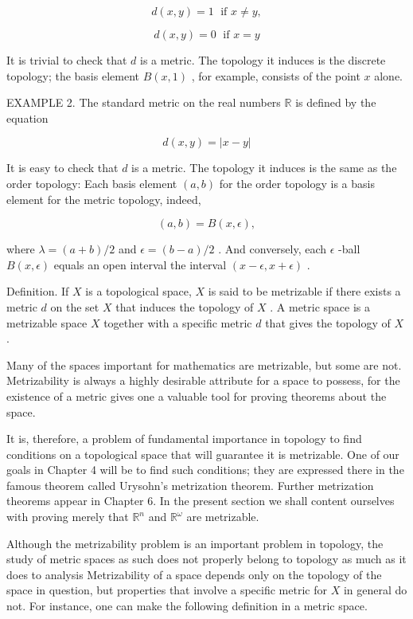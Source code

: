 \documentclass[10pt]{article}
\begin{document}
\[
d\left( {x,y}\right)  = 1\;\text{ if }x \neq  y,
\]

\[
d\left( {x,y}\right)  = 0\;\text{ if }x = y
\]

It is trivial to check that \(d\) is a metric. The topology it induces is the discrete topology; the basis element \(B\left( {x,1}\right)\) , for example, consists of the point \(x\) alone.

EXAMPLE 2. The standard metric on the real numbers \(\mathbb{R}\) is defined by the equation

\[
d\left( {x,y}\right)  = \left| {x - y}\right|
\]

It is easy to check that \(d\) is a metric. The topology it induces is the same as the order topology: Each basis element \(\left( {a,b}\right)\) for the order topology is a basis element for the metric topology, indeed,

\[
\left( {a,b}\right)  = B\left( {x,\epsilon }\right) ,
\]

where \(\lambda  = \left( {a + b}\right) /2\) and \(\epsilon  = \left( {b - a}\right) /2\) . And conversely, each \(\epsilon\) -ball \(B\left( {x,\epsilon }\right)\) equals an open interval the interval \(\left( {x - \epsilon ,x + \epsilon }\right)\) .

Definition. If \(X\) is a topological space, \(X\) is said to be metrizable if there exists a metric \(d\) on the set \(X\) that induces the topology of \(X\) . A metric space is a metrizable space \(X\) together with a specific metric \(d\) that gives the topology of \(X\) .

Many of the spaces important for mathematics are metrizable, but some are not. Metrizability is always a highly desirable attribute for a space to possess, for the existence of a metric gives one a valuable tool for proving theorems about the space.

It is, therefore, a problem of fundamental importance in topology to find conditions on a topological space that will guarantee it is metrizable. One of our goals in Chapter 4 will be to find such conditions; they are expressed there in the famous theorem called Urysohn's metrization theorem. Further metrization theorems appear in Chapter 6. In the present section we shall content ourselves with proving merely that \({\mathbb{R}}^{n}\) and \({\mathbb{R}}^{\omega }\) are metrizable.

Although the metrizability problem is an important problem in topology, the study of metric spaces as such does not properly belong to topology as much as it does to analysis Metrizability of a space depends only on the topology of the space in question, but properties that involve a specific metric for \(X\) in general do not. For instance, one can make the following definition in a metric space.
\end{document}
